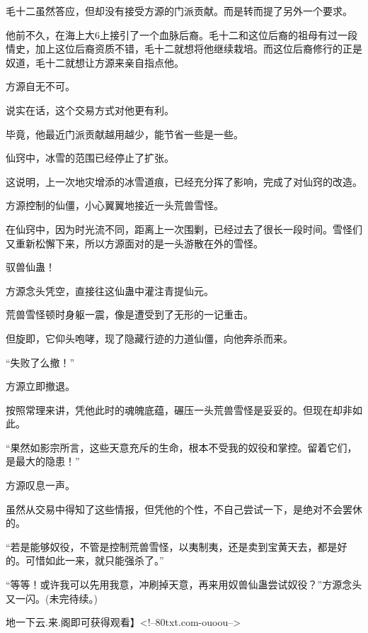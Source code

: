 \begin{this_body}
毛十二虽然答应，但却没有接受方源的门派贡献。而是转而提了另外一个要求。

他前不久，在海上大6上接引了一个血脉后裔。毛十二和这位后裔的祖母有过一段情史，加上这位后裔资质不错，毛十二就想将他继续栽培。而这位后裔修行的正是奴道，毛十二就想让方源来亲自指点他。

方源自无不可。

说实在话，这个交易方式对他更有利。

毕竟，他最近门派贡献越用越少，能节省一些是一些。

仙窍中，冰雪的范围已经停止了扩张。

这说明，上一次地灾增添的冰雪道痕，已经充分挥了影响，完成了对仙窍的改造。

方源控制的仙僵，小心翼翼地接近一头荒兽雪怪。

在仙窍中，因为时光流不同，距离上一次围剿，已经过去了很长一段时间。雪怪们又重新松懈下来，所以方源面对的是一头游散在外的雪怪。

驭兽仙蛊！

方源念头凭空，直接往这仙蛊中灌注青提仙元。

荒兽雪怪顿时身躯一震，像是遭受到了无形的一记重击。

但旋即，它仰头咆哮，现了隐藏行迹的力道仙僵，向他奔杀而来。

“失败了么撤！”

方源立即撤退。

按照常理来讲，凭他此时的魂魄底蕴，碾压一头荒兽雪怪是妥妥的。但现在却非如此。

“果然如影宗所言，这些天意充斥的生命，根本不受我的奴役和掌控。留着它们，是最大的隐患！”

方源叹息一声。

虽然从交易中得知了这些情报，但凭他的个性，不自己尝试一下，是绝对不会罢休的。

“若是能够奴役，不管是控制荒兽雪怪，以夷制夷，还是卖到宝黄天去，都是好的。可惜如此一来，就只能强杀了。”

“等等！或许我可以先用我意，冲刷掉天意，再来用奴兽仙蛊尝试奴役？”方源念头又一闪。(未完待续。)

地一下云.来.阁即可获得观看】<!--80txt.com-ouoou-->

\end{this_body}

